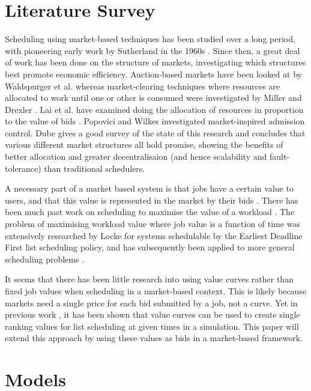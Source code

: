 \documentclass[english,british]{IEEEtran}
\begin{document}
\section{Literature Survey}

Scheduling using market-based techniques has been studied over a long
period, with pioneering early work by Sutherland in the 1960s \cite{Sutherland68}.
Since then, a great deal of work has been done on the structure of
markets, investigating which structures best promote economic efficiency.
Auction-based markets have been looked at by Waldspurger et al. \cite{waldspurger02}
whereas market-clearing techniques where resources are allocated to
work until one or other is consumed were investigated by Miller and
Drexler \cite{millerdrexler88}. Lai et al. have examined doing the
allocation of resources in proportion to the value of bids \cite{Lai05admissons}.
Popovici and Wilkes \cite{popoviciwilkes05} investigated market-inspired
admission control. Dube \cite{dube08} gives a good survey of the
state of this research and concludes that various different market
structures all hold promise, showing the benefits of better allocation
and greater decentralisaion (and hence scalability and fault-tolerance)
than traditional schedulers.

A necessary part of a market based system is that jobs have a certain
value to users, and that this value is represented in the market by
their bids \cite{irwin04}. There has been much past work on scheduling
to maximise the value of a workload \cite{Lee99}. The problem of
maximising workload value where job value is a function of time was
extensively researched by Locke \cite{Locke1986} for systems schedulable
by the Earliest Deadline First list scheduling policy, and has subsequently
been applied to more general scheduling problems \cite{aburkimsherEngD14,chen96}.

It seems that there has been little research into using value curves
rather than fixed job values when scheduling in a market-based context.
This is likely because markets need a single price for each bid submitted
by a job, not a curve. Yet in previous work \cite{aburkimsherEngD14},
it has been shown that value curves can be used to create single ranking
values for list scheduling at given times in a simulation. This paper
will extend this approach by using these values as bids in a market-based
framework.


\section{Models}
\end{document}
